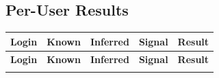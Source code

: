 \documentclass[11pt,a4paper]{article}
\begin{document}
\vspace{8pt}

\subsection*{Per-User Results}

\renewcommand{\arraystretch}{1.15}
\begin{longtable}{>{\ttfamily\small}p{4.4cm} p{3.0cm} p{3.0cm} p{2.6cm} p{1.6cm}}
\toprule
\textbf{Login} & \textbf{Known} & \textbf{Inferred} & \textbf{Signal} & \textbf{Result} \\
\midrule
\endfirsthead
\toprule
\textbf{Login} & \textbf{Known} & \textbf{Inferred} & \textbf{Signal} & \textbf{Result} \\
\midrule
\endhead
\bottomrule
\endfoot


\end{longtable}
\end{document}
